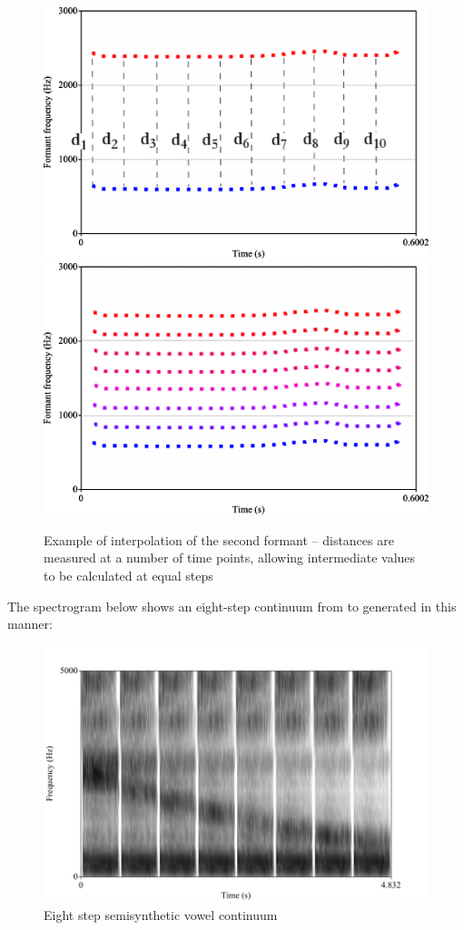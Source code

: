 \documentclass{article}\usepackage[]{graphicx}\usepackage[]{color}
\begin{document}
\begin{figure}[!ht]
\centering
\includegraphics[scale=0.4,keepaspectratio]{distances.png}
\includegraphics[scale=0.4,keepaspectratio]{F2_continuum.png}
\caption{Example of interpolation of the second formant -- distances are measured at a number of time points, allowing intermediate values to be calculated at equal steps}
\end{figure}

The spectrogram below shows an eight-step continuum from \textipa{[i]} to \textipa{[u]} generated in this manner:

\begin{figure}[!ht]
\centering
\includegraphics[scale=0.7,keepaspectratio]{continuum_spec.pdf}
\caption{Eight step semisynthetic vowel continuum}
\end{figure}
\end{document}
